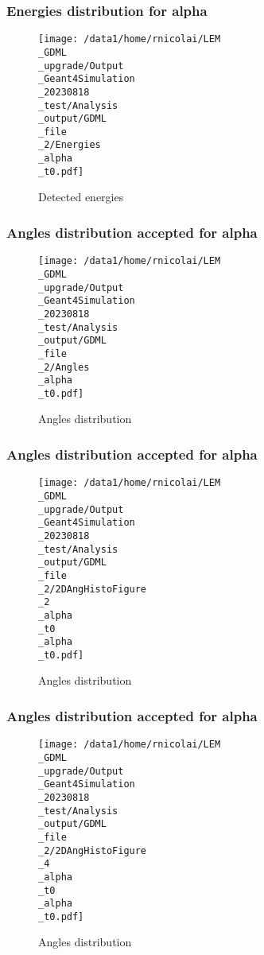 \documentclass[8pt]{beamer}
\begin{document}
            \begin{frame}
                \frametitle{Energies distribution for alpha}
            
        \begin{figure}[h]
            \centering
            \texttt{[image: /data1/home/rnicolai/LEM\\\_GDML\\\_upgrade/Output\\\_Geant4Simulation\\\_20230818\\\_test/Analysis\\\_output/GDML\\\_file\\\_2/Energies\\\_alpha\\\_t0.pdf]}
            \caption{Detected energies}
        \end{figure}
        
            \end{frame}
            
            \begin{frame}
                \frametitle{Angles distribution accepted for alpha}
            
        \begin{figure}[h]
            \centering
            \texttt{[image: /data1/home/rnicolai/LEM\\\_GDML\\\_upgrade/Output\\\_Geant4Simulation\\\_20230818\\\_test/Analysis\\\_output/GDML\\\_file\\\_2/Angles\\\_alpha\\\_t0.pdf]}
            \caption{Angles distribution}
        \end{figure}
        
            \end{frame}
            
            \begin{frame}
                \frametitle{Angles distribution accepted for alpha}
            
        \begin{figure}[h]
            \centering
            \texttt{[image: /data1/home/rnicolai/LEM\\\_GDML\\\_upgrade/Output\\\_Geant4Simulation\\\_20230818\\\_test/Analysis\\\_output/GDML\\\_file\\\_2/2DAngHistoFigure\\\_2\\\_alpha\\\_t0\\\_alpha\\\_t0.pdf]}
            \caption{Angles distribution}
        \end{figure}
        
            \end{frame}
            
            \begin{frame}
                \frametitle{Angles distribution accepted for alpha}
            
        \begin{figure}[h]
            \centering
            \texttt{[image: /data1/home/rnicolai/LEM\\\_GDML\\\_upgrade/Output\\\_Geant4Simulation\\\_20230818\\\_test/Analysis\\\_output/GDML\\\_file\\\_2/2DAngHistoFigure\\\_4\\\_alpha\\\_t0\\\_alpha\\\_t0.pdf]}
            \caption{Angles distribution}
        \end{figure}
        
            \end{frame}
            
\end{document}
